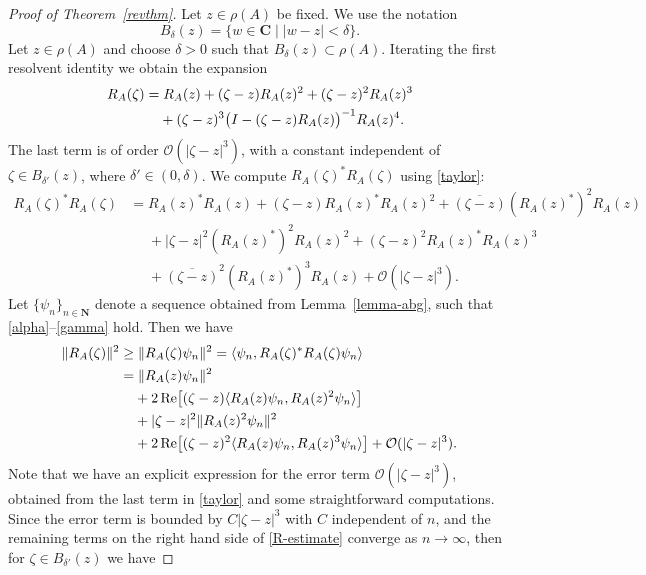 \documentclass[12pt,a4paper]{article}
\numberwithin{equation}{section}
\theoremstyle{plain}
\theoremstyle{definition}
\newcommand{\abs}[1]{\lvert{#1}\rvert}  %
\newcommand{\norm}[1]{\lVert{#1}\rVert} %
\newcommand{\ip}[2]{\langle{#1},{#2}\rangle} %
\DeclareMathOperator{\re}{Re} %
\newcommand{\bdz}{B_{\delta}(z)}
\newcommand{\bddz}{B_{\delta'}(z)}
\newcommand{\cO}{\mathcal{O}}
\newcommand{\bC}{\mathbf{C}}
\newcommand{\bN}{\mathbf{N}}
\begin{document}
\begin{proof}[Proof of Theorem~\ref{revthm}]
	Let $z\in\rho(A)$ be fixed.	We use the notation 
	\begin{equation*}
		\bdz = \{ w\in\bC \mid \abs{w-z}<\delta \}.
	\end{equation*}
	Let $z\in\rho(A)$ and choose $\delta>0$ such that $\bdz\subset\rho(A)$. Iterating the first resolvent identity we obtain the expansion
	\begin{align}\label{taylor}
		R_A(\zeta) &= R_A(z)+(\zeta-z)R_A(z)^2	+ (\zeta-z)^2R_A(z)^3 \notag\\
		&\phantom{={}}+(\zeta-z)^3\bigl(I-(\zeta-z)R_A(z)\bigr)^{-1}R_A(z)^4.
	\end{align}
	The last term is of order $\cO(\abs{\zeta-z}^3)$, with a constant independent of $\zeta\in\bddz$, where $\delta'\in(0,\delta)$. We compute $R_A(\zeta)^{\ast}R_A(\zeta)$ using \eqref{taylor}:
	\begin{align*}
		R_A(\zeta)^{\ast}R_A(\zeta)&=R_A(z)^{\ast}R_A(z) + (\zeta-z)R_A(z)^{\ast}R_A(z)^2 + \overline{(\zeta-z)}(R_A(z)^{\ast})^2R_A(z) \\
		&\phantom{={}} + \abs{\zeta-z}^2(R_A(z)^{\ast})^2R_A(z)^2 + (\zeta-z)^2R_A(z)^{\ast}R_A(z)^3 \\
		&\phantom{={}} + \overline{(\zeta-z)}^2(R_A(z)^{\ast})^3R_A(z) + \cO(\abs{\zeta-z}^3).
	\end{align*}
	Let $\{\psi_n\}_{n\in\bN}$ denote a sequence obtained from Lemma~\ref{lemma-abg}, such that \eqref{alpha}--\eqref{gamma} hold. Then we have
	\begin{align}
		\norm{R_A(\zeta)}^2 &\geq \norm{R_A(\zeta)\psi_n}^2	= \ip{\psi_n}{R_A(\zeta)^{\ast}R_A(\zeta)\psi_n} \notag\\
		&= \norm{R_A(z)\psi_n}^2 \notag\\
		&\phantom{={}} + 2\re\bigl[(\zeta-z)\ip{R_A(z)\psi_n}{R_A(z)^2\psi_n}\bigr] \notag\\
		&\phantom{={}} + \abs{\zeta-z}^2\norm{R_A(z)^2\psi_n}^2 \notag\\
		&\phantom{={}} + 2\re\bigl[(\zeta-z)^2\ip{R_A(z)\psi_n}{R_A(z)^3\psi_n}\bigr] + \cO(\abs{\zeta-z}^3).\label{R-estimate}
	\end{align}
	Note that we have an explicit expression for the error term $\cO(\abs{\zeta-z}^3)$, obtained from the last term in \eqref{taylor} and some straightforward computations. Since the error term is bounded by $C\abs{\zeta-z}^3$ with $C$ independent of $n$, and the remaining terms on the right hand side of \eqref{R-estimate} converge as $n\to\infty$, then for $\zeta\in\bddz$ we have

\end{proof}
\end{document}
